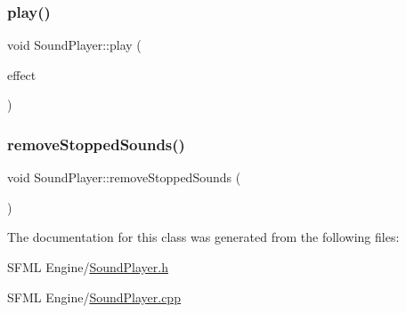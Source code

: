 \mbox{\label{class_sound_player_aa0b85f15f5b13bc41c71eeee6b0a7779}} 
\subsubsection{\texorpdfstring{play()}{play()}}
{\footnotesize\ttfamily void Sound\+Player\+::play (\begin{DoxyParamCaption}\item[{\hyperlink{namespace_sound_effect_a11ffbf1eb89e85a34cbfd5a59b2cd9cb}{Sound\+Effect\+::\+ID}}]{effect }\end{DoxyParamCaption})}

\mbox{\label{class_sound_player_a3fd165dadf60b580b16367b81d84681b}} 
\subsubsection{\texorpdfstring{remove\+Stopped\+Sounds()}{removeStoppedSounds()}}
{\footnotesize\ttfamily void Sound\+Player\+::remove\+Stopped\+Sounds (\begin{DoxyParamCaption}{ }\end{DoxyParamCaption})}



The documentation for this class was generated from the following files\+:\begin{DoxyCompactItemize}
\item 
S\+F\+M\+L Engine/\hyperlink{_sound_player_8h}{Sound\+Player.\+h}\item 
S\+F\+M\+L Engine/\hyperlink{_sound_player_8cpp}{Sound\+Player.\+cpp}\end{DoxyCompactItemize}
